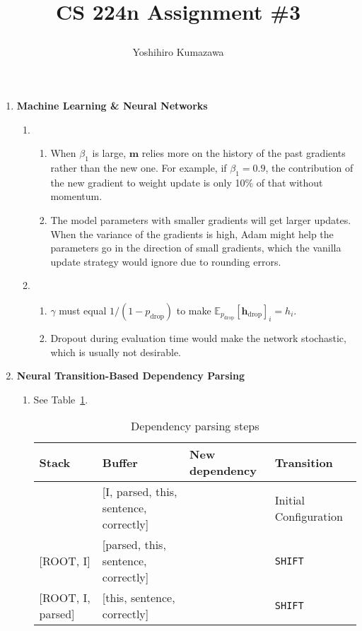 \documentclass[12pt, dvipdfmx]{article}
\title{
  \vspace{-2cm}
  CS 224n Assignment \#3 \\
  \author{Yoshihiro Kumazawa}
}
\begin{document}
\maketitle
\begin{enumerate}[label=\textbf{\arabic*.}]
\item \textbf{Machine Learning \& Neural Networks}
\begin{enumerate}[label=(\alph*)]
\item
\begin{enumerate}[label=\roman*.]
\item When $\beta_1$ is large, $\bm{m}$ relies more on the history of the past gradients rather than the new one. For example, if $\beta_1=0.9$, the contribution of the new gradient to weight update is only 10\% of that without momentum.
\item The model parameters with smaller gradients will get larger updates. When the variance of the gradients is high, Adam might help the parameters go in the direction of small gradients, which the vanilla update strategy would ignore due to rounding errors.
\end{enumerate}
\item
\begin{enumerate}[label=\roman*.]
\item $\gamma$ must equal $1/(1-p_\mathrm{drop})$ to make $\mathbb{E}_{p_\mathrm{drop}}[\bm{h}_\mathrm{drop}]_i=h_i$.
\item Dropout during evaluation time would make the network stochastic, which is usually not desirable.
\end{enumerate}
\end{enumerate}
\item \textbf{Neural Transition-Based Dependency Parsing}
\begin{enumerate}[label=(\alph*)]
\item See Table~\ref{tab:2a}.
\begin{table}[h]
  \centering
  \caption{Dependency parsing steps} \hfill
  \label{tab:2a}
  \begin{adjustbox}{width=\textwidth}
  \begin{tabular}{l|l|l|l}
  Stack & Buffer & New dependency & Transition \\
  \hline
  [ROOT] & [I, parsed, this, sentence, correctly] &  & Initial Configuration \\
  {[ROOT, I]} & [parsed, this, sentence, correctly] &  & \texttt{SHIFT} \\
  {[ROOT, I, parsed]} & [this, sentence, correctly] &  & \texttt{SHIFT} \\

\end{tabular}
\end{adjustbox}
\end{table}
\end{enumerate}
\end{enumerate}
\end{document}
